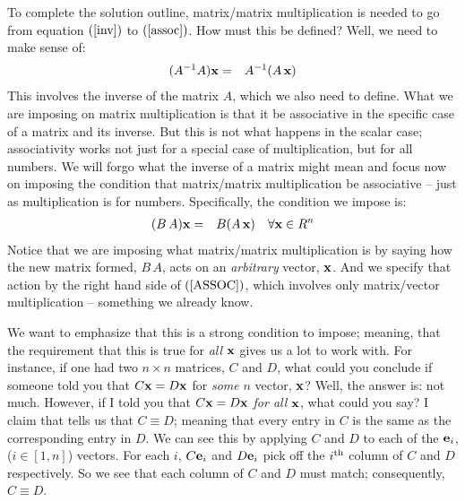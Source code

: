 \documentclass{article}
\begin{document}
To complete the solution outline, matrix/matrix multiplication is needed
to go from equation $(\ref{inv})$ to $(\ref{assoc})$. How must this be defined?
Well, we need to make sense of:
\begin{eqnarray}
  (A^{-1} A) {\bf x} & = & A^{-1} (A \, {\bf x}) 
\end{eqnarray}
This involves the inverse of the matrix $A$, which we also need to define. 
What we are imposing on matrix multiplication is that it be associative in the
specific case of a matrix and its inverse. But this is not what happens in the scalar case;
associativity works not just for a special case of multiplication, but for all numbers.
We will forgo what the inverse of a matrix might mean and focus now on imposing the 
condition that matrix/matrix multiplication be associative -- just as multiplication is for numbers. 
Specifically, the condition we impose is:
\begin{eqnarray}
	(B\, A) {\bf x} & = & B (A \, {\bf x}) \quad \forall {\bf x} \in R^n \label{ASSOC}
\end{eqnarray}
Notice that we are imposing what matrix/matrix multiplication is by saying how the 
new matrix formed, $B \, A$, acts on an {\em arbitrary\/} vector, ${\bf x}$. And we 
specify that action by the right hand side of $(\ref{ASSOC})$, which involves only matrix/vector
multiplication -- something we already know.

We want to emphasize that this is a strong condition to impose; meaning, that the 
requirement that this is true for {\em all\/} ${\bf x}$ gives us a lot to work with.
For instance, if one had two $n\times n$ matrices, $C$ and $D$, what could you conclude if someone
told you that $C {\bf x} = D {\bf x}$ for {\em some\/} $n$ vector, ${\bf x}$?
Well, the answer is: not much.
However, if I told you that $C {\bf x} = D {\bf x}$ {\em for all\/} ${\bf x}$, what could you say?
I claim that tells us that $C \equiv D$; meaning that every entry in $C$ is the same as the corresponding
entry in $D$. We can see this by applying $C$ and $D$ to each of the ${\bf e}_i$, ($i \in [1, n]$) vectors.
For each $i$, $C {\bf e}_i$ and $D {\bf e}_i$ pick off the $i^{\rm th}$ column of 
$C$ and $D$ respectively. So we see that each column of $C$ and $D$ must match; consequently,
$C \equiv D$.
\end{document}
